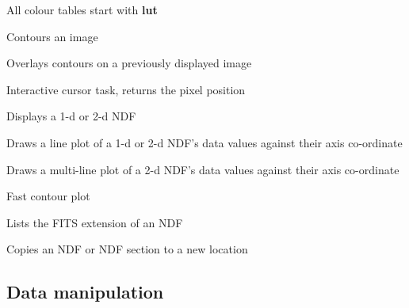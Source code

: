 \documentclass[twoside,11pt]{article}
\newcommand{\task}[1]{\textsf{#1}}
\newcommand{\display}{\xref{\task{display}}{sun95}{DISPLAY}}
\newcommand{\linplot}{\xref{\task{linplot}}{sun95}{LINPLOT}}
\newcommand{\mlinplot}{\xref{\task{mlinplot}}{sun95}{MLINPLOT}}
\newcommand{\fitslist}{\xref{\task{fitslist}}{sun95}{FITSLIST}}
\newcommand{\ndfcopy}{\xref{\task{ndfcopy}}{sun95}{NDFCOPY}}
\newcommand{\cursor}{\xref{\task{cursor}}{sun95}{CURSOR}}
\newcommand{\lutbgyrw}{\xref{\task{lutbgyrw}}{sun95}{LUTBGYRW}}
\newcommand{\contour}{\xref{\task{contour}}{sun95}{CONTOUR}}
\newcommand{\contover}{\xref{\task{contover}}{sun95}{CONTOVER}}
\newcommand{\turbocont}{\xref{\task{turbocont}}{sun95}{TURBOCONT}}
\newcommand{\xref}[3]{#1}
\newcommand{\xlabel}[1]{}
\begin{document}
{\begin{description}
\setlength{\itemsep}{-5pt}

\item[\lutbgyrw] All colour tables start with {\bf lut}
\item[\contour] Contours an image
\item[\contover] Overlays contours on a previously displayed image
\item[\cursor] Interactive cursor task, returns the pixel position
\item[\display] Displays a 1-d or 2-d NDF
\item[\linplot] Draws a line plot of a 1-d or 2-d NDF's data values against their axis co-ordinate
\item[\mlinplot] Draws a multi-line plot of a 2-d NDF's data values against their axis co-ordinate
\item[\turbocont] Fast contour plot
\item[\fitslist] Lists the FITS extension of an NDF
\item[\ndfcopy] Copies an NDF or NDF section to a new location
\end{description}

\subsection{\xlabel{data_manipulation}Data manipulation}

\begin{description}
\setlength{\itemsep}{-5pt}


\end{description}}
\end{document}
